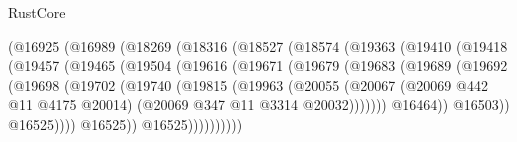 \begin{lexlean}{RustCore}
\begin{coremodule}
                          (@16925
                            (@16989
                              (@18269
                                (@18316
                                  (@18527
                                    (@18574
                                      (@19363
                                        (@19410
                                          (@19418
                                            (@19457
                                              (@19465
                                                (@19504
                                                  (@19616
                                                    (@19671
                                                      (@19679
                                                        (@19683
                                                          (@19689
                                                            (@19692
                                                              (@19698
                                                                (@19702
                                                                  (@19740
                                                                    (@19815
                                                                      (@19963
                                                                        (@20055
                                                                          (@20067
                                                                            (@20069
                                                                              @442
                                                                              @11
                                                                              @4175
                                                                              @20014)
                                                                            (@20069
                                                                              @347
                                                                              @11
                                                                              @3314
                                                                              @20032)))))))
                                                                @16464))
                                                            @16503))
                                                        @16525))))
                                                @16525))
                                            @16525))))))))))

\end{coremodule}
\end{lexlean}
